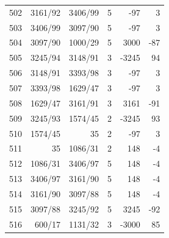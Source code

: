 \documentclass[11pt,a4paper]{article}
\begin{document}
\begin{minipage}[t]{.49\linewidth}
\begin{tabular*}{\linewidth}{@{}r@{\extracolsep{\fill}}rrrrr@{}}
502 & 3161/92 & 3406/99 & 5 & -97 & 3\\
503 & 3406/99 & 3097/90 & 5 & -97 & 3\\
504 & 3097/90 & 1000/29 & 5 & 3000 & -87\\
505 & 3245/94 & 3148/91 & 3 & -3245 & 94\\
506 & 3148/91 & 3393/98 & 3 & -97 & 3\\
507 & 3393/98 & 1629/47 & 3 & -97 & 3\\
508 & 1629/47 & 3161/91 & 3 & 3161 & -91\\
509 & 3245/93 & 1574/45 & 2 & -3245 & 93\\
510 & 1574/45 & 35 & 2 & -97 & 3\\
511 & 35 & 1086/31 & 2 & 148 & -4\\
512 & 1086/31 & 3406/97 & 5 & 148 & -4\\
513 & 3406/97 & 3161/90 & 5 & 148 & -4\\
514 & 3161/90 & 3097/88 & 5 & 148 & -4\\
515 & 3097/88 & 3245/92 & 5 & 3245 & -92\\
516 & 600/17 & 1131/32 & 3 & -3000 & 85\\
\bottomrule\end{tabular*}\end{minipage}\par
\clearpage
{}\par\vspace{4pt}
\end{document}
